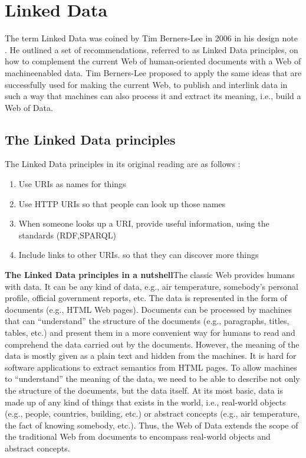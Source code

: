 \documentclass[a4paper,12pt,oneside]{report}
\begin{document}
{{{\section{Linked Data}
{The term Linked Data was coined by Tim Berners-Lee in 2006 in his design note . He outlined a set of recommendations, referred to as Linked Data principles, on how to complement the current Web of human-oriented documents with a Web of machineenabled data. Tim Berners-Lee proposed to apply the same ideas that are successfully used for making the current Web, to publish and interlink data in such a way that machines can also process it and extract its meaning, i.e., build a Web of Data.\\
\subsection{The Linked Data principles}
{The Linked Data principles in its original reading are as follows :}\\
\begin{enumerate}
\item{Use URIs as names for things}
\item{Use HTTP URIs so that people can look up those names}
\item{When someone looks up a URI, provide useful information, using the standards (RDF,SPARQL)}
\item{Include links to other URIs. so that they can discover more things}
\end{enumerate}
\textbf{The Linked Data principles in a nutshell}The classic Web provides humans with data. It can be any kind of data, e.g., air temperature, somebody’s personal profile, official government reports, etc. The data is represented in the form of documents (e.g.,
HTML Web pages). Documents can be processed by machines that can “understand” the structure of the documents (e.g., paragraphs, titles, tables, etc.) and present them in a more convenient way for humans to read and comprehend the data carried out by the documents. However, the meaning of the data is mostly given as a plain text and hidden from the machines. It is hard for software applications to extract semantics from HTML pages. To allow machines to “understand” the meaning of the data, we
need to be able to describe not only the structure of the documents, but the data itself. At its most basic, data is made up of any kind of things that exists in the world, i.e., real-world objects (e.g., people, countries, building, etc.) or abstract concepts (e.g.,
air temperature, the fact of knowing somebody, etc.). Thus, the Web of Data extends the scope of the traditional Web from documents to encompass real-world objects and abstract concepts.
}}}}
\end{document}
